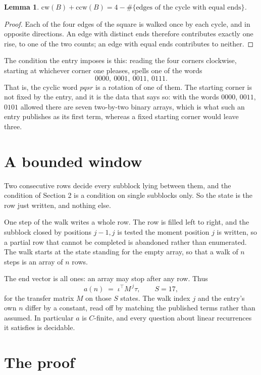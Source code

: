 \documentclass[11pt,a4paper]{article}
\theoremstyle{plain}
\newtheorem{lemma}[theorem]{Lemma}
\theoremstyle{definition}
\begin{document}
\begin{lemma}\label{lem:sum}
$\mathrm{cw}(B)+\mathrm{ccw}(B)=4-\#\{\text{edges of the cycle with equal ends}\}$.
\end{lemma}

\begin{proof}
Each of the four edges of the square is walked once by each cycle, and in opposite directions.
An edge with distinct ends therefore contributes exactly one rise, to one of the two counts;
an edge with equal ends contributes to neither.
\end{proof}

The condition the entry imposes is this: reading the four corners clockwise, starting at whichever corner one pleases, spells one of the words
\[
0000,\ 0001,\ 0011,\ 0111.
\]
That is, the cyclic word $pqsr$ is a rotation of one of them. The starting corner is not fixed by the entry, and it is the data that says so: with the words $0000$, $0011$, $0101$ allowed there are seven two-by-two binary arrays, which is what such an entry publishes as its first term, whereas a fixed starting corner would leave three.

\section{A bounded window}

Two consecutive rows decide every subblock lying between them, and the condition of Section 2 is a condition on single subblocks only. So the state is the row just written, and nothing else.

One step of the walk writes a whole row. The row is filled left to right, and the subblock
closed by positions $j-1,j$ is tested the moment position $j$ is written, so a partial row that
cannot be completed is abandoned rather than enumerated. The walk starts at the state standing
for the empty array, so that a walk of $n$ steps is an array of $n$ rows.

The end vector is all ones: an array may stop after any row. Thus
\[
a(n)\;=\;\iota^{\!\top}M^{\,j}\tau ,\qquad S=17,
\]
for the transfer matrix $M$ on those $S$ states. The walk index $j$ and the entry's own $n$
differ by a constant, read off by matching the published terms rather than assumed. In
particular $a$ is $C$-finite, and every question about linear recurrences it satisfies is
decidable.

\section{The proof}
\end{document}
